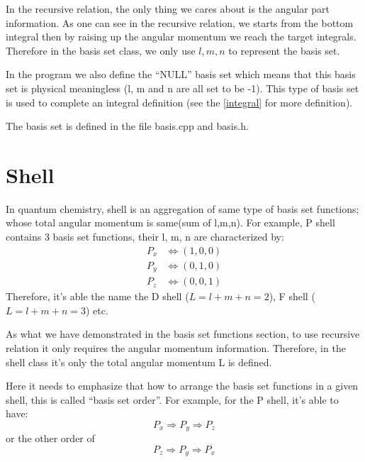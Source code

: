 In the recursive relation, the only thing we cares about 
is the angular part information. As one can see in the recursive
relation, we starts from the bottom integral then by raising up the 
angular momentum we reach the target integrals. Therefore in the basis set class, 
we only use $l,m,n$ to represent the basis set.

In the program we also define the ``NULL'' basis set which means that 
this basis set is physical meaningless (l, m and n are all set to be -1). 
This type of basis set is used to complete an integral definition (see the \ref{integral} 
for more definition).

The basis set is defined in the file basis.cpp and basis.h.

\section{Shell}
%
%
\label{shell}

In quantum chemistry, shell is an aggregation of same type of basis set
functions; whose total angular momentum is same(sum of l,m,n). For example, 
P shell contains 3 basis set functions, their l, m, n are characterized by:
\begin{align}\label{pshell_example}
	P_{x} &\Leftrightarrow (1,0,0) \nonumber \\
	P_{y} &\Leftrightarrow (0,1,0) \nonumber \\
	P_{z} &\Leftrightarrow (0,0,1)
\end{align}
Therefore, it's able the name the D shell ($L = l+m+n = 2$), 
F shell ($L = l+m+n = 3$) etc.

As what we have demonstrated in the basis set functions section, to use
recursive relation it only requires the angular momentum information. 
Therefore, in the shell class it's only the total angular momentum L
is defined.

Here it needs to emphasize that how to arrange the basis set
functions in a given shell, this is called ``basis set order''.
For example, for the P shell, it's able to have:
\begin{equation}
 P_{x} \Rightarrow P_{y} \Rightarrow P_{z}
\end{equation} 
or the other order of 
\begin{equation}
 P_{z} \Rightarrow P_{y} \Rightarrow P_{x}
\end{equation} 

